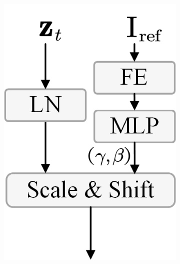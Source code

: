 \begin{figure}[t!]
\begin{minipage}[b]{0.32\textwidth}
\begin{minipage}[b]{\textwidth}
\begin{subfigure}{0.22\linewidth}
                \includegraphics[width=0.95\linewidth]{figs/RefCondition/FE_Ada.png}  
                \caption{}  
                \label{fig:RefConditionAda}  
            \end{subfigure}%
            \hfill
            \begin{subfigure}{0.23\linewidth} %
                \centering

\end{subfigure}
\end{minipage}
\end{minipage}
\end{figure}
